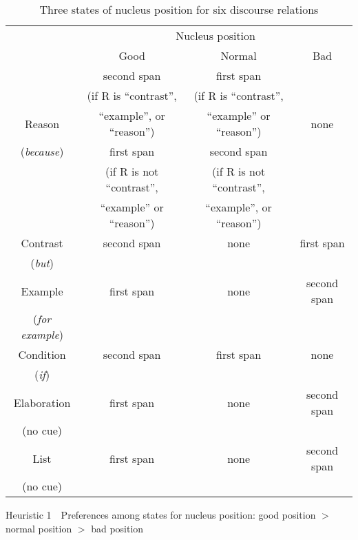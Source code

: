 \documentclass[english]{jnlp_1.2.0}
\begin{document}
\begin{table}[t]
\caption{Three states of nucleus position for six discourse relations}
\begin{center}
 \begin{tabular}{|c||c|c|c|}               \hline
                   & \multicolumn{3}{|c|}{Nucleus position} \\ \cline{2-4}                 
                   & Good & Normal & Bad   \\ \hline \hline
                   & second span      & first span           &   \\
                   & (if \textsf{R} is ``contrast'', & (if \textsf{R} is ``contrast'',  &        \\ 
Reason             & ``example'', or ``reason'') & ``example'' or ``reason'') & none \\ \cline{2-3}
(\textit{because}) & first span       & second span           &          \\
                   & (if \textsf{R} is not ``contrast'',  & (if \textsf{R} is not ``contrast'', &    \\
                   & ``example'' or ``reason'')  & ``example'', or ``reason'') & \\ \hline \hline
Contrast           & second span        & none       & first span   \\ 
(\textit{but})     & & &  \\ \hline \hline
Example            & first span         & none       & second span  \\
(\textit{for example}) &  &  &  \\ \hline \hline
Condition          & second span     & first span   & none  \\
(\textit{if})      &  &  &  \\ \hline \hline
Elaboration        & first span   & none  & second span        \\  
 (no cue)          &  &  &  \\ \hline \hline
List               & first span & none  & second span     \\ 
 (no cue)          &  &  &  \\ \hline 
\end{tabular}
\end{center}
\end{table}

\textsf{Heuristic 1}~~Preferences among states for nucleus position: good position $>$ normal position $>$ bad position
\end{document}
